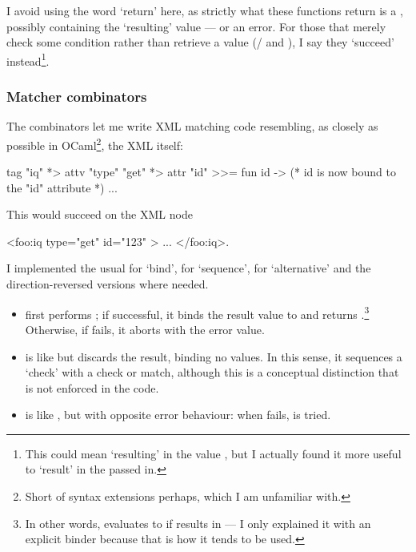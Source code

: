 \documentclass[12pt,a4paper,twoside,openright]{report}
\begin{document}
{I avoid using the word `return' here, as strictly what these functions return is a , possibly containing the `resulting' value --- or an error. For those that merely check some condition rather than retrieve a value (/ and ), I say they `succeed' instead\footnote{This could mean `resulting' in the value \code{()}, but I actually found it more useful to `result' in the  passed in.}.

\subsubsection{Matcher combinators}
The combinators let me write XML matching code resembling, as closely as possible in OCaml\footnote{Short of syntax extensions perhaps, which I am unfamiliar with.}, the XML itself:

\begin{ocaml}
tag "iq" *> attv "type" "get" *> attr "id" >>= fun id ->
  (* id is now bound to the "id" attribute *)
  ...
\end{ocaml}

This would succeed on the XML node
\begin{xml}
<foo:iq type="get" id="123" > ... </foo:iq>.
\end{xml}

I implemented the usual \code{>>=} for `bind', \code{*>} for `sequence', \code{<|>} for `alternative' and the direction-reversed versions where needed.

\begin{itemize}
  \item {} first performs ; if successful, it binds the result value to  and returns .\footnote{In other words,  evaluates to  if  results in  --- I only explained it with an explicit binder because that is how it tends to be used.} Otherwise, if  fails, it aborts with the error value.

  \item {} is like \code{>>=} but discards the result, binding no values. In this sense, it sequences a `check' with a check or match, although this is a conceptual distinction that is not enforced in the code.

  \item {} is like \code{*>}, but with opposite error behaviour: when  fails,  is tried.
\end{itemize}

}
\end{document}
